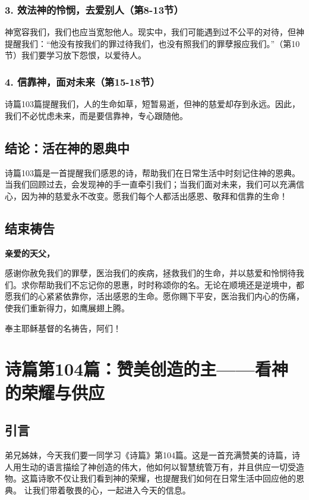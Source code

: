 \documentclass[a4paper, 12pt]{article}
\begin{document}
\subsubsection*{3. 效法神的怜悯，去爱别人（第8-13节）}
神宽容我们，我们也应当宽恕他人。现实中，我们可能遇到过不公平的对待，但神提醒我们：“他没有按我们的罪过待我们，也没有照我们的罪孽报应我们。”（第10节）我们要学习放下怨恨，以爱待人。

\subsubsection*{4. 信靠神，面对未来（第15-18节）}
诗篇103篇提醒我们，人的生命如草，短暂易逝，但神的慈爱却存到永远。因此，我们不必忧虑未来，而是要信靠神，专心跟随他。

\subsection*{结论：活在神的恩典中}

诗篇103篇是一首提醒我们感恩的诗，帮助我们在日常生活中时刻记住神的恩典。当我们回顾过去，会发现神的手一直牵引我们；当我们面对未来，我们可以充满信心，因为神的慈爱永不改变。愿我们每个人都活出感恩、敬拜和信靠的生命！

\subsection*{结束祷告}

\textbf{亲爱的天父，}

感谢你赦免我们的罪孽，医治我们的疾病，拯救我们的生命，并以慈爱和怜悯待我们。求你帮助我们不忘记你的恩惠，时时称颂你的名。无论在顺境还是逆境中，都愿我们的心紧紧依靠你，活出感恩的生命。愿你赐下平安，医治我们内心的伤痛，使我们重新得力，如鹰展翅上腾。

奉主耶稣基督的名祷告，阿们！
\newpage
\section{诗篇第104篇：赞美创造的主——看神的荣耀与供应}
\subsection*{引言}
弟兄姊妹，今天我们要一同学习《诗篇》第104篇。这是一首充满赞美的诗篇，诗人用生动的语言描绘了神创造的伟大，他如何以智慧统管万有，并且供应一切受造物。这篇诗歌不仅让我们看到神的荣耀，也提醒我们如何在日常生活中回应他的恩典。
让我们带着敬畏的心，一起进入今天的信息。
\end{document}

